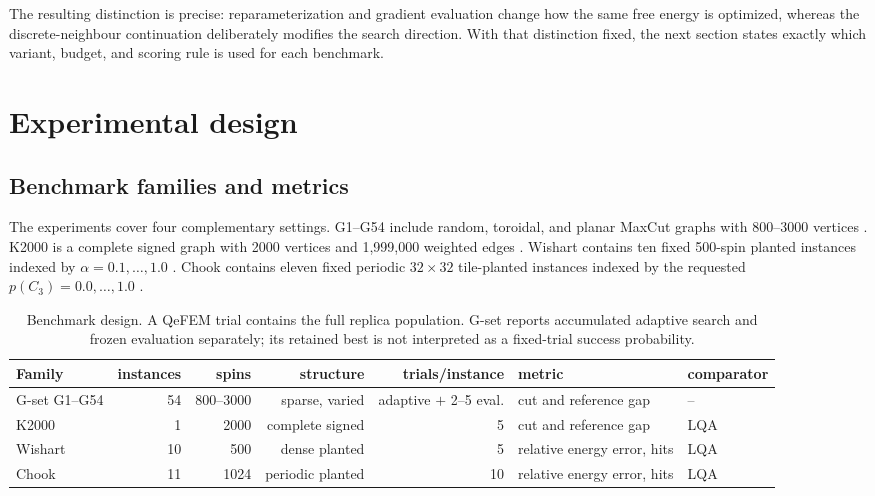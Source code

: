\documentclass[
  aps,
  prx,
  reprint,
  amsmath,
  amssymb,
  groupedaddress,
  nofootinbib,
  floatfix,
  longbibliography
]{revtex4-2}
\newcommand{\qefem}{QeFEM}
\newcommand{\lqa}{\textsc{LQA}}
\begin{document}
The resulting distinction is precise: reparameterization and gradient
evaluation change how the same free energy is optimized, whereas the
discrete-neighbour continuation deliberately modifies the search direction.
With that distinction fixed, the next section states exactly which variant,
budget, and scoring rule is used for each benchmark.

\section{Experimental design}
\label{sec:experiments}

\subsection{Benchmark families and metrics}

The experiments cover four complementary settings.  G1--G54 include random,
toroidal, and planar MaxCut graphs with 800--3000 vertices \cite{yeGset}.
K2000 is a complete signed graph with 2000 vertices and 1,999,000 weighted
edges \cite{inagaki2016science}.  Wishart contains ten fixed 500-spin planted
instances indexed by $\alpha=0.1,\ldots,1.0$ \cite{hamze2020}.  Chook contains
eleven fixed periodic $32\times32$ tile-planted instances indexed by the
requested $p(C_3)=0.0,\ldots,1.0$ \cite{perera2020}.

\begin{table}[t]
\caption{Benchmark design.  A \qefem{} trial contains the full replica
population.  G-set reports accumulated adaptive search and frozen evaluation
separately; its retained best is not interpreted as a fixed-trial success
probability.}
\label{tab:benchmark-design}
\centering
\small
\setlength{\tabcolsep}{5.5pt}
\begin{tabular}{lrrrrll}
\toprule
Family & instances & spins & structure & trials/instance & metric & comparator \\
\midrule
G-set G1--G54 & 54 & 800--3000 & sparse, varied & adaptive $+$ 2--5 eval. & cut and reference gap & -- \\
K2000 & 1 & 2000 & complete signed & 5 & cut and reference gap & \lqa{} \\
Wishart & 10 & 500 & dense planted & 5 & relative energy error, hits & \lqa{} \\
Chook & 11 & 1024 & periodic planted & 10 & relative energy error, hits & \lqa{} \\
\bottomrule
\end{tabular}
\end{table}
\end{document}
